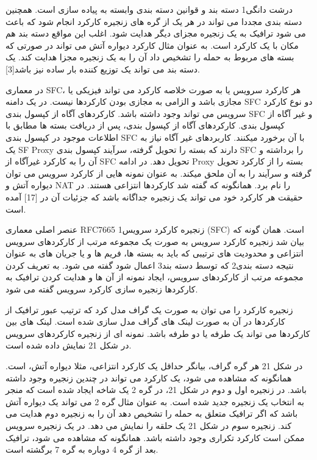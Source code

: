 \documentclass{book}
\begin{document}
درشت دانگی1 دسته بند و قوانین دسته بندی وابسته به پیاده سازی است. همچنین دسته بندی مجددا می تواند در هر یک از گره های زنجیره کارکرد انجام شود که باعث می شود ترافیک به یک زنجیره مجزای دیگر هدایت شود. اغلب این مواقع دسته بند هم مکان با یک کارکرد است. به عنوان مثال کارکرد دیواره آتش می تواند در صورتی که بسته های مربوط به حمله را تشخیص داد آن را به یک زنجیره مجزا هدایت کند. یک دسته بند می تواند یک توزیع کننده بار ساده نیز باشد[3].


در معماری SFC، هر کارکرد سرویس یا به صورت خلاصه کارکرد می تواند فیزیکی یا مجازی باشد و الزامی به مجازی بودن کارکردها نیست. در یک دامنه SFC دو نوع کارکرد سرویس می تواند وجود داشته باشد. کارکردهای آگاه از کپسول بندی SFC و غیر آگاه از کپسول بندی. کارکردهای آگاه از کپسول بندی، پس از دریافت بسته ها مطابق با اطلاعات موجود در کپسول بندی SFC با آن برخورد میکنند. کاربردهای غیر آگاه نیاز به یک SF Proxy دارند که بسته را تحویل گرفته، سرآیند کپسول بندی SFC را برداشته و آن را به کارکرد غیرآگاه از SFC تحویل دهد. در ادامه Proxy بسته را از کارکرد تحویل گرفته و سرآیند را به آن ملحق میکند. به عنوان نمونه هایی از کارکرد سرویس می توان دیواره آتش و NAT را نام برد. همانگونه که گفته شد کارکردها انتزاعی هستند. در حقیقت هر کارکرد خود می تواند یک زنجیره جداگانه باشد که جزئیات آن در [17] آمده است.


عنصر اصلی معماری RFC7665 زنجیره کارکرد سرویس1 (SFC) است. همان گونه که بیان شد زنجیره کارکرد سرویس به صورت یک مجموعه مرتب از کارکردهای سرویس انتزاعی و محدودیت های ترتیبی که باید به بسته ها، فریم ها و یا جریان های به عنوان نتیجه دسته بندی2 که توسط دسته بند3 اعمال شود گفته می شود. به تعریف کردن مجموعه مرتب از کارکردهای سرویس، ایجاد نمونه از آن ها و هدایت کردن ترافیک به کارکردها زنجیره سازی کارکرد سرویس گفته می شود.

زنجیره کارکرد را می توان به صورت یک گراف مدل کرد که ترتیب عبور ترافیک از کارکردها در آن به صورت لینک های گراف مدل سازی شده است. لینک های بین کارکردها می تواند یک طرفه یا دو طرفه باشد. نمونه ای از زنجیره کارکردهای سرویس در شکل 21 نمایش داده شده است.

در شکل 21 هر گره گراف، بیانگر حداقل یک کارکرد انتزاعی، مثلا دیواره آتش، است. همانگونه که مشاهده می شود، یک کارکرد می تواند در چندین زنجیره وجود داشته باشد. در زنجیره اول و دوم در شکل 21، در گره 2  یک شاخه ایجاد شده است که منجر به انتخاب یک زنجیره جدید شده است. به عنوان مثال گره 2 می تواند یک دیواره آتش باشد که اگر ترافیک متعلق به حمله را تشخیص دهد آن را به زنجیره دوم هدایت می کند. زنجیره سوم در شکل 21 یک حلقه را نمایش می دهد. در یک زنجیره سرویس ممکن است کارکرد تکراری وجود داشته باشد. همانگونه که مشاهده می شود، ترافیک بعد از گره 4 دوباره به گره 7 برگشته است.
\end{document}
